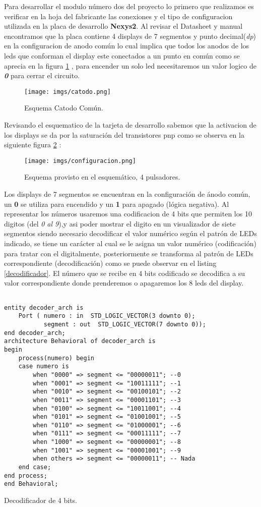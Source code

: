 \documentclass[paper=a4, fontsize=12pt]{article} 		%
\numberwithin{equation}{section}						%
\numberwithin{table}{section} 							%
\begin{document}
Para desarrollar el modulo número dos del proyecto lo primero que realizamos es verificar en la hoja del fabricante las conexiones y el tipo de configuracion utilizada en la placa de desarrollo \textbf{Nexys2}. Al revisar el Datasheet y manual encontramos que la placa contiene 4 displays de 7 segmentos y punto decimal(\textit{dp})  en la configuracion de anodo común lo cual implica que todos los anodos de los leds que conforman el display este conectados a un punto en común como se aprecia en la figura \ref{fig:catodo} , para encender un solo led necesitaremos un valor logico de \textbf{\textit{0}} para cerrar el circuito. 
\begin{figure}[H]
  \centering
     \texttt{[image: imgs/catodo.png]}
  \caption{Esquema Catodo Común.}
    \label{fig:catodo}
\end{figure}
Revisando el esquematico de la tarjeta de desarrollo sabemos que la activacion de los displays se da por la saturación del transistores pnp como se observa en la siguiente figura \ref{fig:esquema} :
\begin{figure}[H]
  \centering
     \texttt{[image: imgs/configuracion.png]}
  \caption{Esquema provisto en el esquemático, 4 pulsadores.}
    \label{fig:esquema}
\end{figure}
Los displays de 7 segmentos se encuentran en la configuración de ánodo común, un \textbf{0} se utiliza para encendido y un \textbf{1} para apagado (lógica negativa). Al representar los números usaremos una codificacion de 4 bits que permiten los 10 digitos (del \textit{0 al 9}),y asi poder mostrar el digito en un visualizador de siete segmentos siendo necesario decodificar el valor numérico según el patrón de LEDs indicado,  se tiene un carácter al cual se le asigna un valor numérico (codificación) para tratar con el digitalmente, posteriormente se transforma al patrón de LEDs correspondiente (decodificación) como se puede observar en el listing \ref{decodificador}. El número que se recibe en 4 bits codificado se decodifica a su valor correspondiente donde prenderemos o apagaremos los 8 leds del display.
\begin{listing}[H]
	\begin{verbatim}

entity decoder_arch is
    Port ( numero : in  STD_LOGIC_VECTOR(3 downto 0);
           segment : out  STD_LOGIC_VECTOR(7 downto 0));
end decoder_arch;
architecture Behavioral of decoder_arch is
begin
	process(numero) begin
	case numero is
		when "0000" => segment <= "00000011"; --0
		when "0001" => segment <= "10011111"; --1
		when "0010" => segment <= "00100101"; --2
		when "0011" => segment <= "00001101"; --3
		when "0100" => segment <= "10011001"; --4
		when "0101" => segment <= "01001001"; --5
		when "0110" => segment <= "01000001"; --6
		when "0111" => segment <= "00011111"; --7
		when "1000" => segment <= "00000001"; --8
		when "1001" => segment <= "00001001"; --9
		when others => segment <= "00000011"; -- Nada
	end case;
end process;
end Behavioral;

\end{verbatim}
\caption{Decodificador de 4 bits.}
    \label{decodificador}
\end{listing}
\end{document}
